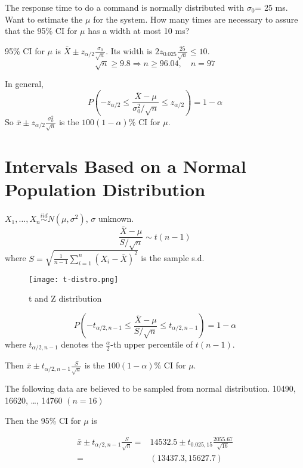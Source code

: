 \begin{exmp}
The response time to do a command is normally distributed with $\sigma_0$= 25 ms. Want to estimate the $\mu$ for the system. How many times are necessary to assure that the 95\% CI for $\mu$ has a width at most 10 ms? 

95\% CI for $\mu$ is $\bar{X}\pm z_{\alpha/2} \frac{\sigma_0}{\sqrt{n}} $. Its width is $2 z_{0.025} \frac{25}{\sqrt{n}} \leq 10$.
\[\sqrt{n}\geq 9.8 \Rightarrow n\geq 96.04, \quad n=97\]

\end{exmp}

\begin{prop}
In general,
 \[P\left(-z_{\alpha/2} \leq \frac{\bar{X}-\mu}{\sigma_0^2/\sqrt{n}}  \leq  z_{\alpha/2} \right) = 1-\alpha\]
So $\bar{x} \pm  z_{\alpha/2} \frac{\sigma_0^2}{\sqrt{n}} $ is the $100(1-\alpha)\%$ CI for $\mu$.
\end{prop}

\section{Intervals Based on a Normal Population Distribution}
\noindent{}

\begin{theo}
$X_1,\dots,X_n \overset{iid}{\sim} N(\mu,\sigma^2)$, $\sigma$ unknown.
\[\frac{\bar{X}-\mu}{S/\sqrt{n}} \sim t(n-1)\]
where $S=\sqrt{\frac{1}{n-1} \sum_{i=1}^n (X_i-\bar{X})^2}$ is the sample s.d.

\begin{figure}[H]
\caption{t and Z distribution}
\centering
\texttt{[image: t-distro.png]}
\end{figure}
 \[P\left(-t_{\alpha/2,n-1} \leq \frac{\bar{X}-\mu}{S/\sqrt{n}}  \leq  t_{\alpha/2,n-1} \right) = 1-\alpha\]
 where $t_{\alpha/2,n-1}$ denotes the $\frac{\alpha}{2}$-th upper percentile of $t(n-1)$.

Then $\bar{x} \pm  t_{\alpha/2,n-1} \frac{S}{\sqrt{n}} $ is the $100(1-\alpha)\%$ CI for $\mu$.
\end{theo}

\begin{exmp}
The following data are believed to be sampled from normal distribution. 10490, 16620, \dots, 14760 $(n=16)$

Then the 95\% CI for $\mu$ is 

\begin{align*}
\bar{x} \pm  t_{\alpha/2,n-1} \frac{S}{\sqrt{n}}=&14532.5 \pm  t_{0.025,15} \frac{2055.67}{\sqrt{16}}\\
=&(13437.3, 15627.7)
\end{align*} 

\end{exmp}
